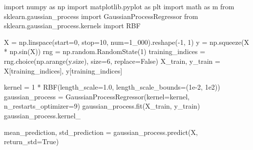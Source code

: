 \documentclass[
  letterpaper,
  DIV=11,
  numbers=noendperiod]{scrreprt}
\newenvironment{Shaded}{\begin{snugshade}}{\end{snugshade}}
\newcommand{\DecValTok}[1]{\textcolor[rgb]{0.68,0.00,0.00}{#1}}
\newcommand{\FloatTok}[1]{\textcolor[rgb]{0.68,0.00,0.00}{#1}}
\newcommand{\ImportTok}[1]{\textcolor[rgb]{0.00,0.46,0.62}{#1}}
\newcommand{\NormalTok}[1]{\textcolor[rgb]{0.00,0.23,0.31}{#1}}
\newcommand{\OperatorTok}[1]{\textcolor[rgb]{0.37,0.37,0.37}{#1}}
\newcommand{\VariableTok}[1]{\textcolor[rgb]{0.07,0.07,0.07}{#1}}
\begin{document}
\begin{Shaded}
\begin{Highlighting}[]
\ImportTok{import}\NormalTok{ numpy }\ImportTok{as}\NormalTok{ np}
\ImportTok{import}\NormalTok{ matplotlib.pyplot }\ImportTok{as}\NormalTok{ plt}
\ImportTok{import}\NormalTok{ math }\ImportTok{as}\NormalTok{ m}
\ImportTok{from}\NormalTok{ sklearn.gaussian\_process }\ImportTok{import}\NormalTok{ GaussianProcessRegressor}
\ImportTok{from}\NormalTok{ sklearn.gaussian\_process.kernels }\ImportTok{import}\NormalTok{ RBF}

\NormalTok{X }\OperatorTok{=}\NormalTok{ np.linspace(start}\OperatorTok{=}\DecValTok{0}\NormalTok{, stop}\OperatorTok{=}\DecValTok{10}\NormalTok{, num}\OperatorTok{=}\DecValTok{1\_000}\NormalTok{).reshape(}\OperatorTok{{-}}\DecValTok{1}\NormalTok{, }\DecValTok{1}\NormalTok{)}
\NormalTok{y }\OperatorTok{=}\NormalTok{ np.squeeze(X }\OperatorTok{*}\NormalTok{ np.sin(X))}
\NormalTok{rng }\OperatorTok{=}\NormalTok{ np.random.RandomState(}\DecValTok{1}\NormalTok{)}
\NormalTok{training\_indices }\OperatorTok{=}\NormalTok{ rng.choice(np.arange(y.size), size}\OperatorTok{=}\DecValTok{6}\NormalTok{, replace}\OperatorTok{=}\VariableTok{False}\NormalTok{)}
\NormalTok{X\_train, y\_train }\OperatorTok{=}\NormalTok{ X[training\_indices], y[training\_indices]}

\NormalTok{kernel }\OperatorTok{=} \DecValTok{1} \OperatorTok{*}\NormalTok{ RBF(length\_scale}\OperatorTok{=}\FloatTok{1.0}\NormalTok{, length\_scale\_bounds}\OperatorTok{=}\NormalTok{(}\FloatTok{1e{-}2}\NormalTok{, }\FloatTok{1e2}\NormalTok{))}
\NormalTok{gaussian\_process }\OperatorTok{=}\NormalTok{ GaussianProcessRegressor(kernel}\OperatorTok{=}\NormalTok{kernel, n\_restarts\_optimizer}\OperatorTok{=}\DecValTok{9}\NormalTok{)}
\NormalTok{gaussian\_process.fit(X\_train, y\_train)}
\NormalTok{gaussian\_process.kernel\_}

\NormalTok{mean\_prediction, std\_prediction }\OperatorTok{=}\NormalTok{ gaussian\_process.predict(X, return\_std}\OperatorTok{=}\VariableTok{True}\NormalTok{)}


\end{Highlighting}
\end{Shaded}
\end{document}
